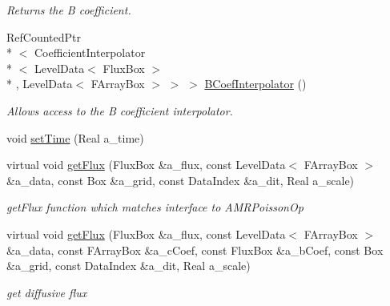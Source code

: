 \begin{DoxyCompactItemize}
\begin{DoxyCompactList}\small\item\em Returns the B coefficient. \end{DoxyCompactList}\item 
\hypertarget{class_darcy_brinkman_op_a16cce095d955f2514589e45bd6b348df}{Ref\-Counted\-Ptr\\*
$<$ Coefficient\-Interpolator\\*
$<$ Level\-Data$<$ Flux\-Box $>$\\*
, Level\-Data$<$ F\-Array\-Box $>$ $>$ $>$ \hyperlink{class_darcy_brinkman_op_a16cce095d955f2514589e45bd6b348df}{B\-Coef\-Interpolator} ()}\label{class_darcy_brinkman_op_a16cce095d955f2514589e45bd6b348df}

\begin{DoxyCompactList}\small\item\em Allows access to the B coefficient interpolator. \end{DoxyCompactList}\item 
void \hyperlink{class_darcy_brinkman_op_a50dc1353f78c310c788763b122ca939d}{set\-Time} (Real a\-\_\-time)
\item 
virtual void \hyperlink{class_darcy_brinkman_op_adfd7590e98c5edd78140265bb05eef17}{get\-Flux} (Flux\-Box \&a\-\_\-flux, const Level\-Data$<$ F\-Array\-Box $>$ \&a\-\_\-data, const Box \&a\-\_\-grid, const Data\-Index \&a\-\_\-dit, Real a\-\_\-scale)
\begin{DoxyCompactList}\small\item\em get\-Flux function which matches interface to A\-M\-R\-Poisson\-Op \end{DoxyCompactList}\item 
\hypertarget{class_darcy_brinkman_op_acf0aa656f124288b7d3cd2a11b1ab0be}{virtual void \hyperlink{class_darcy_brinkman_op_acf0aa656f124288b7d3cd2a11b1ab0be}{get\-Flux} (Flux\-Box \&a\-\_\-flux, const Level\-Data$<$ F\-Array\-Box $>$ \&a\-\_\-data, const F\-Array\-Box \&a\-\_\-c\-Coef, const Flux\-Box \&a\-\_\-b\-Coef, const Box \&a\-\_\-grid, const Data\-Index \&a\-\_\-dit, Real a\-\_\-scale)}\label{class_darcy_brinkman_op_acf0aa656f124288b7d3cd2a11b1ab0be}

\begin{DoxyCompactList}\small\item\em get diffusive flux \end{DoxyCompactList}\end{DoxyCompactItemize}
